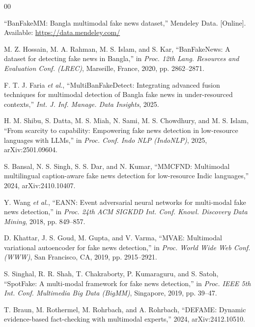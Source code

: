 \documentclass[conference,a4paper]{IEEEtran}
\begin{document}
\begin{thebibliography}{00}

 ``BanFakeMM: Bangla multimodal fake news dataset,''
Mendeley Data. [Online]. Available: \url{https://data.mendeley.com/}

 M. Z. Hossain, M. A. Rahman, M. S. Islam, and S. Kar,
``BanFakeNews: A dataset for detecting fake news in Bangla,'' in
\emph{Proc. 12th Lang. Resources and Evaluation Conf. (LREC)}, Marseille,
France, 2020, pp. 2862--2871.

 F. T. J. Faria \emph{et al.},
``MultiBanFakeDetect: Integrating advanced fusion techniques for multimodal
detection of Bangla fake news in under-resourced contexts,''
\emph{Int. J. Inf. Manage. Data Insights}, 2025.

 H. M. Shibu, S. Datta, M. S. Miah, N. Sami,
M. S. Chowdhury, and M. S. Islam, ``From scarcity to capability: Empowering
fake news detection in low-resource languages with LLMs,'' in
\emph{Proc. Conf. Indo NLP (IndoNLP)}, 2025, arXiv:2501.09604.

 S. Bansal, N. S. Singh, S. S. Dar, and N. Kumar,
``MMCFND: Multimodal multilingual caption-aware fake news detection for
low-resource Indic languages,'' 2024, arXiv:2410.10407.

 Y. Wang \emph{et al.}, ``EANN: Event adversarial neural
networks for multi-modal fake news detection,'' in \emph{Proc. 24th ACM
SIGKDD Int. Conf. Knowl. Discovery Data Mining}, 2018, pp. 849--857.

 D. Khattar, J. S. Goud, M. Gupta, and V. Varma,
``MVAE: Multimodal variational autoencoder for fake news detection,'' in
\emph{Proc. World Wide Web Conf. (WWW)}, San Francisco, CA, 2019,
pp. 2915--2921.

 S. Singhal, R. R. Shah, T. Chakraborty, P. Kumaraguru, and
S. Satoh, ``SpotFake: A multi-modal framework for fake news detection,'' in
\emph{Proc. IEEE 5th Int. Conf. Multimedia Big Data (BigMM)}, Singapore, 2019,
pp. 39--47.

 T. Braun, M. Rothermel, M. Rohrbach, and A. Rohrbach,
``DEFAME: Dynamic evidence-based fact-checking with multimodal experts,''
2024, arXiv:2412.10510.


\end{thebibliography}
\end{document}

